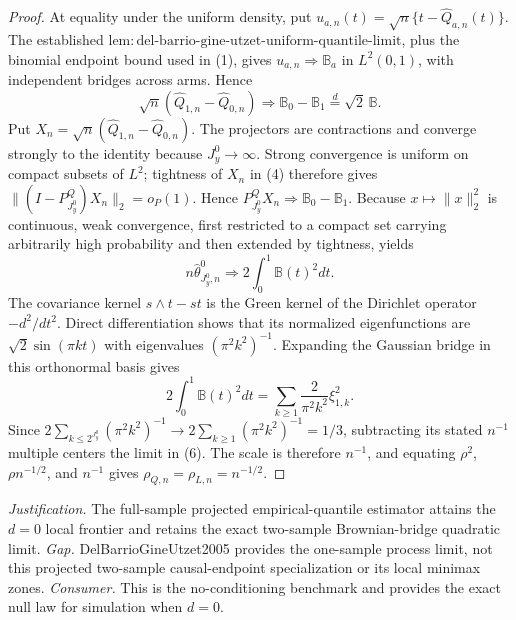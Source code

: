 \documentclass{article}
\begin{document}
\begin{proof}
At equality under the uniform density, put \(u_{a,n}(t)=\sqrt n\{t-\widehat Q_{a,n}(t)\}\). The established \(\mathrm{lem{:}del\text{-}barrio\text{-}gine\text{-}utzet\text{-}uniform\text{-}quantile\text{-}limit}\), plus the binomial endpoint bound used in (1), gives \(u_{a,n}\Rightarrow\mathbb B_a\) in \(L^2(0,1)\), with independent bridges across arms. Hence
\[
\sqrt n(\widehat Q_{1,n}-\widehat Q_{0,n})\Rightarrow\mathbb B_0-\mathbb B_1\stackrel d=\sqrt2\,\mathbb B. \tag{4}
\]
Put \(X_n=\sqrt n(\widehat Q_{1,n}-\widehat Q_{0,n})\). The projectors are contractions and converge strongly to the identity because \(J_y^0\to\infty\). Strong convergence is uniform on compact subsets of \(L^2\); tightness of \(X_n\) in (4) therefore gives \(\|(I-P^Q_{J_y^0})X_n\|_2=o_P(1)\). Hence \(P^Q_{J_y^0}X_n\Rightarrow\mathbb B_0-\mathbb B_1\). Because \(x\mapsto\|x\|_2^2\) is continuous, weak convergence, first restricted to a compact set carrying arbitrarily high probability and then extended by tightness, yields
\[
n\widehat\theta^0_{J_y^0,n}\Rightarrow2\int_0^1\mathbb B(t)^2dt.    \tag{5}
\]
The covariance kernel \(s\wedge t-st\) is the Green kernel of the Dirichlet operator \(-d^2/dt^2\). Direct differentiation shows that its normalized eigenfunctions are \(\sqrt2\sin(\pi kt)\) with eigenvalues \((\pi^2k^2)^{-1}\). Expanding the Gaussian bridge in this orthonormal basis gives
\[
2\int_0^1\mathbb B(t)^2dt=\sum_{k\ge1}\frac{2}{\pi^2k^2}\xi_{1,k}^2. \tag{6}
\]
Since \(2\sum_{k\le2^{J_y^0}}(\pi^2k^2)^{-1}\to2\sum_{k\ge1}(\pi^2k^2)^{-1}=1/3\), subtracting its stated \(n^{-1}\) multiple centers the limit in (6). The scale is therefore \(n^{-1}\), and equating \(\rho^2\), \(\rho n^{-1/2}\), and \(n^{-1}\) gives \(\rho_{Q,n}=\rho_{L,n}=n^{-1/2}\).
\end{proof}
\par\smallskip\noindent \textit{Justification.} The full-sample projected empirical-quantile estimator attains the \(d=0\) local frontier and retains the exact two-sample Brownian-bridge quadratic limit. \textit{Gap.} DelBarrioGineUtzet2005 provides the one-sample process limit, not this projected two-sample causal-endpoint specialization or its local minimax zones. \textit{Consumer.} This is the no-conditioning benchmark and provides the exact null law for simulation when \(d=0\).
\end{document}
